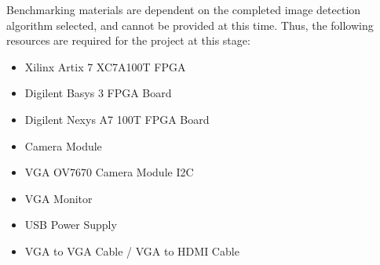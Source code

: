 Benchmarking materials are dependent on the completed image detection algorithm selected, and cannot be provided at this time. 
Thus, the following resources are required for the project at this stage:

\begin{itemize}
    \item Xilinx Artix 7 XC7A100T FPGA
    \item Digilent Basys 3 FPGA Board
    \item Digilent Nexys A7 100T FPGA Board
    \item Camera Module
    \item VGA OV7670 Camera Module I2C
    \item VGA Monitor
    \item USB Power Supply
    \item VGA to VGA Cable / VGA to HDMI Cable
\end{itemize}
